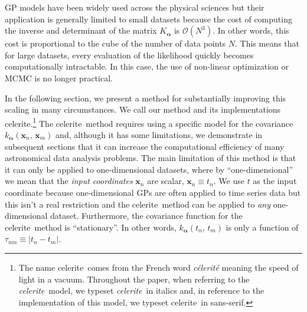 \documentclass[manuscript, letterpaper]{aastex6}
\makeatletter
\let\origsection\section
\renewcommand\section{\@ifstar{\starsection}{\nostarsection}}
\newcommand\nostarsection[1]{\sectionprelude\origsection{#1}}
\newcommand\starsection[1]{\sectionprelude\origsection*{#1}}
\newcommand\sectionprelude{\vspace{1em}}
\newcommand{\project}[1]{\textsf{#1}}
\newcommand{\celerite}{\project{celerite}}
\newcommand{\celeriteterm}{\emph{celerite}}
\newcommand{\foreign}[1]{\emph{#1}}
\newcommand{\bvec}[1]{{\ensuremath{\boldsymbol{#1}}}}
\newcommand{\response}[1]{{\color{blue}#1}}
\makeatother
\begin{document}
GP models have been widely used across the physical sciences but their
application is generally limited to small datasets because the cost of
computing the inverse and determinant of the matrix $K_\bvec{\alpha}$ is
$\mathcal{O}(N^3)$.
In other words, this cost is proportional to the cube of the number of data
points $N$.
This means that for large datasets, every evaluation of the likelihood
quickly becomes computationally intractable.
In this case, the use of non-linear optimization or MCMC is no longer
practical.

In the following section, we present a method for substantially improving this
scaling in many circumstances.
We call our method and its implementations \celerite.\footnote{The name
\celerite\ comes from the French word \foreign{c\'elerit\'e} meaning the speed
of light in a vacuum.
\response{Throughout the paper, when referring to the \celeriteterm\ model, we
typeset \celeriteterm\ in italics and, in reference to the implementation of
this model, we typeset \celerite\ in sans-serif.}}
The \celerite\ method requires using a specific model
for the covariance $k_\bvec{\alpha}(\bvec{x}_n,\,\bvec{x}_m)$ and, although it
has some limitations, we demonstrate in subsequent sections that it can
increase the computational efficiency of many astronomical data analysis
problems.
The main limitation of this method is that it can only be applied to
one-dimensional datasets, where by ``one-dimensional'' we mean that the
 \emph{input coordinates} $\bvec{x}_n$ are scalar, $\bvec{x}_n \equiv
t_n$.
We use $t$ as the input coordinate because one-dimensional GPs are often
applied to time series data but this isn't a real restriction and the
\celerite\ method can be applied to \emph{any} one-dimensional dataset.
Furthermore, the covariance function for the \celerite\ method is
``stationary''.
In other words, $k_\bvec{\alpha}(t_n,\,t_m)$ is only a function of $\tau_{nm}
\equiv |t_n - t_m|$.


\section{The celerite model}
\end{document}
